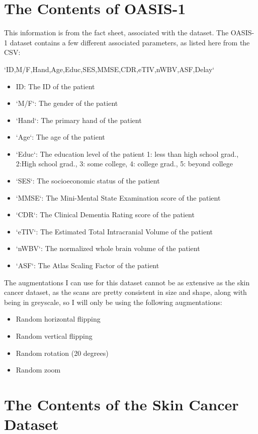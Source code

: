 \documentclass[]{final_report}
\begin{document}
\section{The Contents of OASIS-1}
This information is from the fact sheet, associated with the dataset. \cite{OASISFactSheet}
The OASIS-1 dataset contains a few different associated parameters, as listed here from the CSV:

`ID,M/F,Hand,Age,Educ,SES,MMSE,CDR,eTIV,nWBV,ASF,Delay`

\begin{itemize}
  \item ID: The ID of the patient
  \item `M/F`: The gender of the patient
  \item `Hand`: The primary hand of the patient
  \item `Age`: The age of the patient
  \item `Educ`: The education level of the patient 1: less than high school grad., 2:High school grad., 3: some college, 4: college grad., 5: beyond college
  \item `SES`: The socioeconomic status of the patient
  \item `MMSE`: The Mini-Mental State Examination score of the patient
  \item `CDR`: The Clinical Dementia Rating score of the patient
  \item `eTIV`: The Estimated Total Intracranial Volume of the patient
  \item `nWBV`: The normalized whole brain volume of the patient
  \item `ASF`: The Atlas Scaling Factor of the patient
\end{itemize}

The augmentations I can use for this dataset cannot be as extensive as the skin cancer dataset, as the scans are pretty consistent in size and shape, along with being in greyscale, so I will only be using the following augmentations:
\begin{itemize}
  \item Random horizontal flipping
  \item Random vertical flipping
  \item Random rotation (20 degrees)
  \item Random zoom
\end{itemize}

\section{The Contents of the Skin Cancer Dataset}
\end{document}
